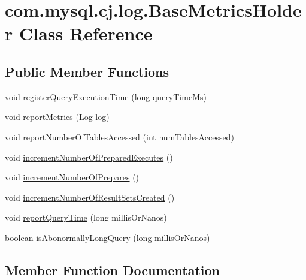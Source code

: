 \hypertarget{classcom_1_1mysql_1_1cj_1_1log_1_1_base_metrics_holder}{}\section{com.\+mysql.\+cj.\+log.\+Base\+Metrics\+Holder Class Reference}
\label{classcom_1_1mysql_1_1cj_1_1log_1_1_base_metrics_holder}
\subsection*{Public Member Functions}
\begin{DoxyCompactItemize}
\item 
void \mbox{\hyperlink{classcom_1_1mysql_1_1cj_1_1log_1_1_base_metrics_holder_a4f2787da929ecc62efd5a93acda4ba58}{register\+Query\+Execution\+Time}} (long query\+Time\+Ms)
\item 
void \mbox{\hyperlink{classcom_1_1mysql_1_1cj_1_1log_1_1_base_metrics_holder_ab7fb39a092cd81f015cc3c3d4eac9846}{report\+Metrics}} (\mbox{\hyperlink{interfacecom_1_1mysql_1_1cj_1_1log_1_1_log}{Log}} log)
\item 
void \mbox{\hyperlink{classcom_1_1mysql_1_1cj_1_1log_1_1_base_metrics_holder_a75061da20b187347e1bd4d07e0c7db34}{report\+Number\+Of\+Tables\+Accessed}} (int num\+Tables\+Accessed)
\item 
void \mbox{\hyperlink{classcom_1_1mysql_1_1cj_1_1log_1_1_base_metrics_holder_a8f77e2819880c83046e9ce70805eca81}{increment\+Number\+Of\+Prepared\+Executes}} ()
\item 
void \mbox{\hyperlink{classcom_1_1mysql_1_1cj_1_1log_1_1_base_metrics_holder_a64a51a4972740262da8c2f4ccbe2b23d}{increment\+Number\+Of\+Prepares}} ()
\item 
void \mbox{\hyperlink{classcom_1_1mysql_1_1cj_1_1log_1_1_base_metrics_holder_a9810296c9d133eba09bf2b9677e63b88}{increment\+Number\+Of\+Result\+Sets\+Created}} ()
\item 
void \mbox{\hyperlink{classcom_1_1mysql_1_1cj_1_1log_1_1_base_metrics_holder_a46e6e0b9a7b352ab1ed37dea9d193913}{report\+Query\+Time}} (long millis\+Or\+Nanos)
\item 
boolean \mbox{\hyperlink{classcom_1_1mysql_1_1cj_1_1log_1_1_base_metrics_holder_abe821df45163288d358e3b60a65c9fe5}{is\+Abonormally\+Long\+Query}} (long millis\+Or\+Nanos)
\end{DoxyCompactItemize}


\subsection{Member Function Documentation}
\mbox{\label{classcom_1_1mysql_1_1cj_1_1log_1_1_base_metrics_holder_a8f77e2819880c83046e9ce70805eca81}} 
